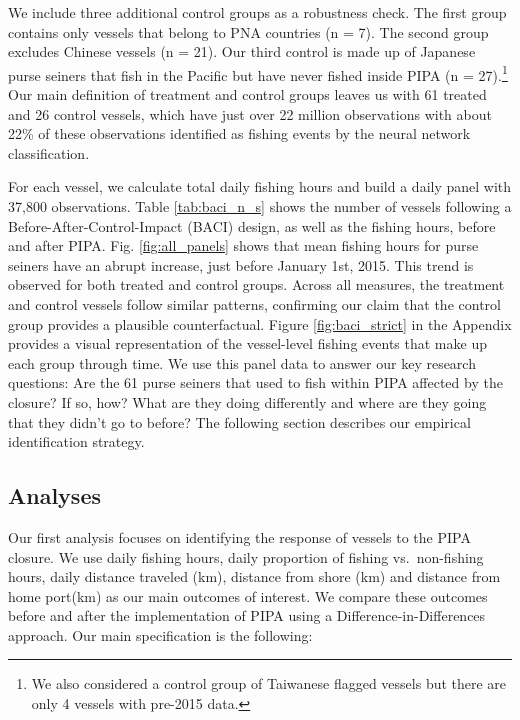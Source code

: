 \documentclass[11pt,english]{article}
\begin{document}
We include three additional control groups as a
robustness check. The first group contains only vessels that belong to PNA countries (n
= 7). The second group excludes Chinese vessels (n = 21). Our third control
is made up of Japanese purse seiners that fish in the Pacific but have
never fished inside PIPA (n =
27).\footnote{We also considered a control group of Taiwanese flagged vessels but there are only 4 vessels with pre-2015 data.}
Our main definition of treatment and control groups leaves us with 61 treated and 26
control vessels, which have just over 22 million
observations with about 22\% of these observations identified as fishing events by the neural network classification.

For each vessel, we calculate total daily fishing hours and build a daily panel
with 37,800 observations. Table \ref{tab:baci_n_s} shows the number
of vessels following a Before-After-Control-Impact (BACI) design, as well as the fishing hours, before
and after PIPA. Fig. \ref{fig:all_panels} shows that mean fishing hours
for purse seiners have an abrupt increase, just before January 1st,
2015. This trend is observed for both treated and control groups. Across
all measures, the treatment and control vessels follow similar patterns,
confirming our claim that the control group provides a plausible
counterfactual. Figure \ref{fig:baci_strict} in the Appendix provides a visual
representation of the vessel-level fishing events that make up each
group through time. We use this panel data to answer our key research questions: 
Are the 61 purse seiners that used to fish within PIPA affected by the closure? If so, how?
What are they doing differently and where are they going that they didn't go to before?
The following section describes our empirical identification strategy.



\subsection{Analyses}\label{analyses}

Our first analysis focuses on identifying the response of 
vessels to the PIPA closure. We use daily fishing hours, daily proportion of fishing vs.~non-fishing
hours, daily distance traveled (km), distance from shore (km) and
distance from home
port(km) as our main outcomes of interest.
We compare these outcomes before and after the implementation
of PIPA using a Difference-in-Differences approach. Our main
specification is the following:
\end{document}

